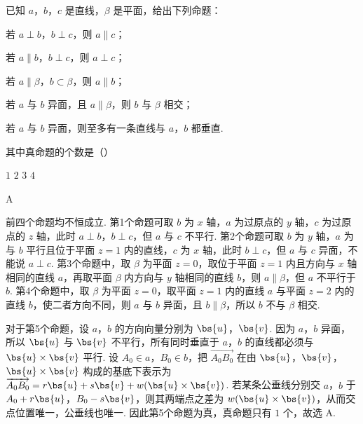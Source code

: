 \begin{problem}
已知 \(a\)，\(b\)，\(c\) 是直线，\(\beta\) 是平面，给出下列命题：

\begin{circlelist}
\item 若 \(a \perp b\)，\(b \perp c\)，则 \(a \parallel c\)；
\item 若 \(a \parallel b\)，\(b \perp c\)，则 \(a \perp c\)；
\item 若 \(a \parallel \beta\)，\(b \subset \beta\)，则 \(a \parallel b\)；
\item 若 \(a\) 与 \(b\) 异面，且 \(a \parallel \beta\)，则 \(b\) 与 \(\beta\) 相交；
\item 若 \(a\) 与 \(b\) 异面，则至多有一条直线与 \(a\)，\(b\) 都垂直.
\end{circlelist}

其中真命题的个数是（\quad）

\choices
    {\(1\)}
    {\(2\)}
    {\(3\)}
    {\(4\)}
\end{problem}

\begin{answer}
A
\end{answer}

\begin{solution}
前四个命题均不恒成立. 第1个命题可取 \(b\) 为 \(x\) 轴，\(a\) 为过原点的 \(y\) 轴，\(c\) 为过原点的 \(z\) 轴，此时 \(a\perp b\)，\(b\perp c\)，但 \(a\) 与 \(c\) 不平行. 第2个命题可取 \(b\) 为 \(y\) 轴，\(a\) 为与 \(b\) 平行且位于平面 \(z=1\) 内的直线，\(c\) 为 \(x\) 轴，此时 \(b\perp c\)，但 \(a\) 与 \(c\) 异面，不能说 \(a\perp c\). 第3个命题中，取 \(\beta\) 为平面 \(z=0\)，取位于平面 \(z=1\) 内且方向与 \(x\) 轴相同的直线 \(a\)，再取平面 \(\beta\) 内方向与 \(y\) 轴相同的直线 \(b\)，则 \(a\parallel\beta\)，但 \(a\) 不平行于 \(b\). 第4个命题中，取 \(\beta\) 为平面 \(z=0\)，取平面 \(z=1\) 内的直线 \(a\) 与平面 \(z=2\) 内的直线 \(b\)，使二者方向不同，则 \(a\) 与 \(b\) 异面，且 \(b\parallel\beta\)，所以 \(b\) 不与 \(\beta\) 相交.

对于第5个命题，设 \(a\)，\(b\) 的方向向量分别为 \(\bs{u}\)，\(\bs{v}\). 因为 \(a\)，\(b\) 异面，所以 \(\bs{u}\) 与 \(\bs{v}\) 不平行，所有同时垂直于 \(a\)，\(b\) 的直线都必须与 \(\bs{u}\times\bs{v}\) 平行. 设 \(A_0\in a\)，\(B_0\in b\)，把 \(\overrightarrow{A_0B_0}\) 在由 \(\bs{u}\)，\(\bs{v}\)，\(\bs{u}\times\bs{v}\) 构成的基底下表示为 \(\overrightarrow{A_0B_0}=r\bs{u}+s\bs{v}+w(\bs{u}\times\bs{v})\). 若某条公垂线分别交 \(a\)，\(b\) 于 \(A_0+r\bs{u}\)，\(B_0-s\bs{v}\)，则其两端点之差为 \(w(\bs{u}\times\bs{v})\)，从而交点位置唯一，公垂线也唯一. 因此第5个命题为真，真命题只有 \(1\) 个，故选 A.
\end{solution}

